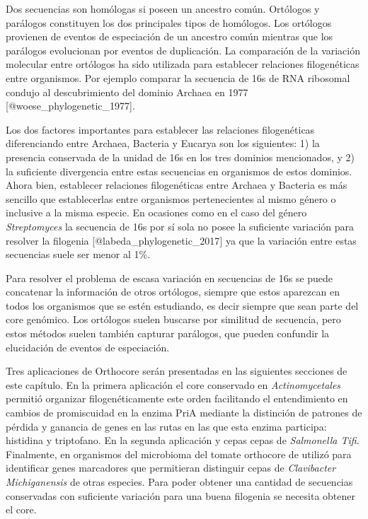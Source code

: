 \documentclass[]{article}
\begin{document}
Dos secuencias son homólogas si poseen un ancestro común. Ortólogos y
parálogos constituyen los dos principales tipos de homólogos. Los
ortólogos provienen de eventos de especiación de un ancestro común
mientras que los parálogos evolucionan por eventos de duplicación. La
comparación de la variación molecular entre ortólogos ha sido utilizada
para establecer relaciones filogenéticas entre organismos. Por ejemplo
comparar la secuencia de 16s de RNA ribosomal condujo al descubrimiento
del dominio Archaea en 1977 {[}@woese\_phylogenetic\_1977{]}.

Los dos factores importantes para establecer las relaciones
filogenéticas diferenciando entre Archaea, Bacteria y Eucarya son los
siguientes: 1) la presencia conservada de la unidad de 16s en los tres
dominios mencionados, y 2) la suficiente divergencia entre estas
secuencias en organismos de estos dominios. Ahora bien, establecer
relaciones filogenéticas entre Archaea y Bacteria es más sencillo que
establecerlas entre organismos pertenecientes al mismo género o
inclusive a la misma especie. En ocasiones como en el caso del género
\emph{Streptomyces} la secuencia de 16s por sí sola no posee la
suficiente variación para resolver la filogenia
{[}@labeda\_phylogenetic\_2017{]} ya que la variación entre estas
secuencias suele ser menor al 1\%.

Para resolver el problema de escasa variación en secuencias de 16s se
puede concatenar la información de otros ortólogos, siempre que estos
aparezcan en todos los organismos que se estén estudiando, es decir
siempre que sean parte del core genómico. Los ortólogos suelen buscarse
por similitud de secuencia, pero estos métodos suelen también capturar
parálogos, que pueden confundir la elucidación de eventos de
especiación.

Tres aplicaciones de Orthocore serán presentadas en las siguientes
secciones de este capítulo. En la primera aplicación el core conservado
en \emph{Actinomycetales} permitió organizar filogenéticamente este
orden facilitando el entendimiento en cambios de promiscuidad en la
enzima PriA mediante la distinción de patrones de pérdida y ganancia de
genes en las rutas en las que esta enzima participa: histidina y
triptofano. En la segunda aplicación y cepas cepas de \emph{Salmonella
Tifi}. Finalmente, en organismos del microbioma del tomate orthocore de
utilizó para identificar genes marcadores que permitieran distinguir
cepas de \emph{Clavibacter Michiganensis} de otras especies. Para poder
obtener una cantidad de secuencias conservadas con suficiente variación
para una buena filogenia se necesita obtener el core.
\end{document}
